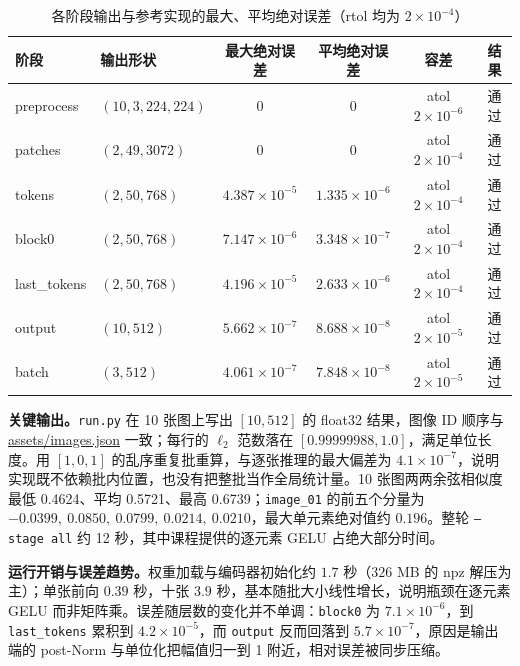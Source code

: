 \documentclass[a4paper,12pt]{article}
\begin{document}
\begin{table}[H]
\centering
\caption{各阶段输出与参考实现的最大、平均绝对误差（rtol 均为 $2\times10^{-4}$）}
\label{tab:stage}
\small
\setlength{\tabcolsep}{3.5pt}
\begin{tabular}{|l|l|c|c|c|c|}
\hline
阶段 & 输出形状 & 最大绝对误差 & 平均绝对误差 & 容差 & 结果 \\
\hline
preprocess   & $(10,3,224,224)$ & $0$ & $0$ & atol $2\times10^{-6}$ & 通过 \\
patches      & $(2,49,3072)$    & $0$ & $0$ & atol $2\times10^{-4}$ & 通过 \\
tokens       & $(2,50,768)$     & $4.387\times10^{-5}$ & $1.335\times10^{-6}$ & atol $2\times10^{-4}$ & 通过 \\
block0       & $(2,50,768)$     & $7.147\times10^{-6}$ & $3.348\times10^{-7}$ & atol $2\times10^{-4}$ & 通过 \\
last\_tokens & $(2,50,768)$     & $4.196\times10^{-5}$ & $2.633\times10^{-6}$ & atol $2\times10^{-4}$ & 通过 \\
output       & $(10,512)$       & $5.662\times10^{-7}$ & $8.688\times10^{-8}$ & atol $2\times10^{-5}$ & 通过 \\
batch        & $(3,512)$        & $4.061\times10^{-7}$ & $7.848\times10^{-8}$ & atol $2\times10^{-5}$ & 通过 \\
\hline
\end{tabular}
\end{table}

\textbf{关键输出。}\texttt{run.py} 在 10 张图上写出 $[10,512]$ 的 float32 结果，图像 ID 顺序与 \url{assets/images.json} 一致；每行的 $\ell_2$ 范数落在 $[0.99999988,1.0]$，满足单位长度。用 $[1,0,1]$ 的乱序重复批重算，与逐张推理的最大偏差为 $4.1\times10^{-7}$，说明实现既不依赖批内位置，也没有把整批当作全局统计量。10 张图两两余弦相似度最低 0.4624、平均 0.5721、最高 0.6739；\texttt{image\_01} 的前五个分量为 $-0.0399,\ 0.0850,\ 0.0799,\ 0.0214,\ 0.0210$，最大单元素绝对值约 $0.196$。整轮 \texttt{--stage all} 约 12 秒，其中课程提供的逐元素 GELU 占绝大部分时间。

\textbf{运行开销与误差趋势。}权重加载与编码器初始化约 $1.7$ 秒（$326$ MB 的 npz 解压为主）；单张前向 $0.39$ 秒，十张 $3.9$ 秒，基本随批大小线性增长，说明瓶颈在逐元素 GELU 而非矩阵乘。误差随层数的变化并不单调：\texttt{block0} 为 $7.1\times10^{-6}$，到 \texttt{last\_tokens} 累积到 $4.2\times10^{-5}$，而 \texttt{output} 反而回落到 $5.7\times10^{-7}$，原因是输出端的 post-Norm 与单位化把幅值归一到 1 附近，相对误差被同步压缩。
\end{document}
